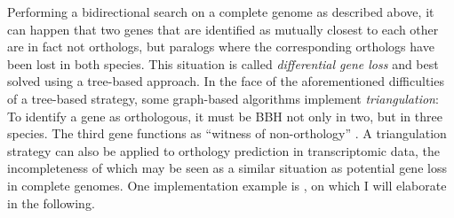 Performing a bidirectional search on a complete genome as described above, it
can happen that two genes that are identified as mutually closest to each other
are in fact not orthologs, but paralogs where the corresponding orthologs have
been lost in both species. This situation is called \emph{differential gene
loss} and best solved using a tree-based approach. In the face of the
aforementioned difficulties of a tree-based strategy, some graph-based
algorithms implement \emph{triangulation}: To identify a gene as orthologous, it
must be BBH not only in two, but in three species. The third gene functions as
``witness of non-orthology'' \citep{dessimoz2006}. A triangulation strategy can
also be applied to orthology prediction in transcriptomic data, the
incompleteness of which may be seen as a similar situation as potential gene
loss in complete genomes. One implementation example is \hamstr
\citep{ebersberger2009}, on which I will elaborate in the following.


